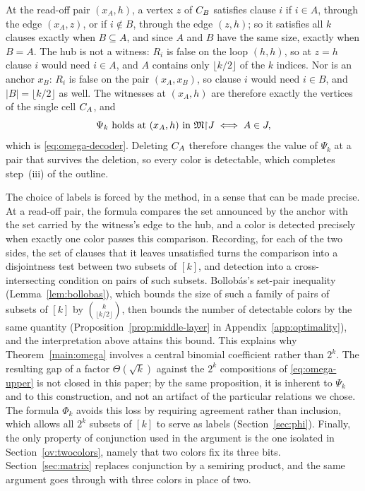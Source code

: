 At the read-off pair $(x_A,h)$, a
vertex $z$ of $C_{B}$ satisfies clause $i$ if $i\in A$, through the edge
$(x_A,z)$, or if $i\notin B$, through the edge $(z,h)$; so it satisfies
all $k$ clauses exactly when $B\subseteq A$, and since $A$ and $B$ have the
same size, exactly when $B=A$. The hub is not a witness: $R_i$ is false on
the loop $(h,h)$, so at $z=h$ clause $i$ would need $i\in A$, and $A$
contains only $\lfloor k/2\rfloor$ of the $k$ indices. Nor is an anchor
$x_B$: $R_i$ is false on the pair $(x_A,x_B)$, so clause $i$ would need
$i\in B$, and $|B|=\lfloor k/2\rfloor$ as well. The witnesses at $(x_A,h)$
are therefore
exactly the vertices of the single cell $C_{A}$, and
\[
 \Psi_k\text{ holds at }(x_A,h)\text{ in }\mathfrak M\mathord{\restriction} J
 \iff A\in J,
\]
which is \eqref{eq:omega-decoder}. Deleting $C_{A}$ therefore changes the
value of $\Psi_k$ at a pair that survives the deletion, so every color is
detectable, which completes step~(iii) of the outline.

The choice of labels is forced by the method, in a sense that can be made
precise. At a read-off pair, the formula compares the set announced by the
anchor with the set carried by the witness's edge to the hub, and a color is
detected precisely when exactly one color passes this comparison.
Recording, for each of the two sides, the set of clauses that it leaves
unsatisfied turns the comparison into a disjointness test between two
subsets of $[k]$, and detection into a cross-intersecting condition on
pairs of such subsets. Bollob\'as's set-pair inequality
(Lemma~\ref{lem:bollobas}), which bounds the size of such a family of pairs
of subsets of $[k]$ by $\binom{k}{\lfloor k/2\rfloor}$, then bounds the
number of detectable colors by the same quantity
(Proposition~\ref{prop:middle-layer} in Appendix~\ref{app:optimality}), and
the interpretation above attains this bound. This explains why
Theorem~\ref{main:omega} involves a central binomial coefficient rather
than $2^k$. The resulting gap of a factor
$\Theta(\sqrt k)$ against the $2^k$ compositions of \eqref{eq:omega-upper}
is not closed in this paper; by the same proposition, it is inherent to
$\Psi_k$ and to this construction, and not an artifact of the particular
relations we chose. The formula $\Phi_k$ avoids this loss by requiring
agreement rather than inclusion, which allows all $2^k$ subsets of $[k]$ to
serve as labels (Section~\ref{sec:phi}). Finally, the only property of
conjunction used in the argument is the one isolated in
Section~\ref{ov:twocolors}, namely that two colors fix its three bits.
Section~\ref{sec:matrix} replaces conjunction by a semiring product, and the
same argument goes through with three colors in place of two.